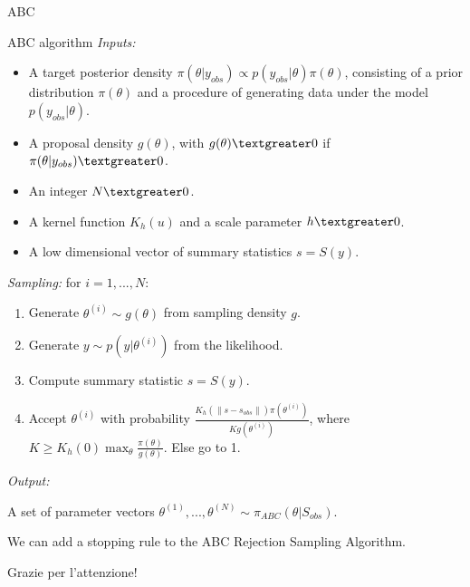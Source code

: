 \documentclass{beamer}
\theoremstyle{plain}
\begin{document}
\begin{section}{ABC}
\begin{frame}{ABC algorithm}
	\emph{Inputs:}
	\begin{itemize}
		\item A target posterior density $\pi(\theta | y_{obs}) \propto p(y_{obs}|\theta) \pi(\theta)$, consisting of a prior distribution $\pi(\theta)$ and a procedure of generating data under the model $p(y_{obs}|\theta)$.
		\item A proposal density $g(\theta)$, with $g(\theta)\textgreater 0 $ if $\pi(\theta | y_{obs}) \textgreater 0$.
		\item An integer $N \textgreater0$.
		\item A kernel function $K_h(u)$ and a scale parameter $h \textgreater 0$.
		\item A low dimensional vector of summary statistics $s=S(y)$.
	\end{itemize}
	\emph{Sampling:} for $i= 1,..., N$:
	\begin{enumerate}
		\item Generate $\theta ^ {(i)} \sim g(\theta)$ from sampling density $g$.
		\item Generate $ y \sim p(y|\theta ^ {(i)})$ from the likelihood.
		\item Compute summary statistic $s = S(y)$.
		\item Accept $\theta ^ {(i)}$ with probability $\frac{K_h(\parallel s-s_{obs}\parallel)   \pi(\theta ^ {(i)})}{K g(\theta ^ {(i)})}$, where $K \geq K_h(0)\max_{\theta}{\frac{\pi(\theta)}{g(\theta)}}$. Else go to 1.
	\end{enumerate}
	\emph{Output:}
	
	A set of parameter vectors $\theta ^ {(1)},..., \theta ^ {(N)} \sim \pi_{ABC}(\theta |S_{obs})$.
	
	We can add a stopping rule to the ABC Rejection Sampling Algorithm.
\end{frame}
	
\end{section}






\begin{frame}
\vspace{1.1cm}
\centering
{\LARGE Grazie per l'attenzione!}
\end{frame}
\end{document}
